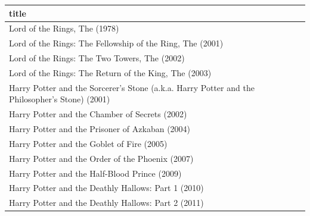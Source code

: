 \documentclass[]{article}
\begin{document}
\begin{longtable}[]{@{}l@{}}
\toprule
\begin{minipage}[b]{0.97\columnwidth}\raggedright\strut
title\strut
\end{minipage}\tabularnewline
\midrule
\endhead
\begin{minipage}[t]{0.97\columnwidth}\raggedright\strut
Lord of the Rings, The (1978)\strut
\end{minipage}\tabularnewline
\begin{minipage}[t]{0.97\columnwidth}\raggedright\strut
Lord of the Rings: The Fellowship of the Ring, The (2001)\strut
\end{minipage}\tabularnewline
\begin{minipage}[t]{0.97\columnwidth}\raggedright\strut
Lord of the Rings: The Two Towers, The (2002)\strut
\end{minipage}\tabularnewline
\begin{minipage}[t]{0.97\columnwidth}\raggedright\strut
Lord of the Rings: The Return of the King, The (2003)\strut
\end{minipage}\tabularnewline
\begin{minipage}[t]{0.97\columnwidth}\raggedright\strut
Harry Potter and the Sorcerer's Stone (a.k.a. Harry Potter and the
Philosopher's Stone) (2001)\strut
\end{minipage}\tabularnewline
\begin{minipage}[t]{0.97\columnwidth}\raggedright\strut
Harry Potter and the Chamber of Secrets (2002)\strut
\end{minipage}\tabularnewline
\begin{minipage}[t]{0.97\columnwidth}\raggedright\strut
Harry Potter and the Prisoner of Azkaban (2004)\strut
\end{minipage}\tabularnewline
\begin{minipage}[t]{0.97\columnwidth}\raggedright\strut
Harry Potter and the Goblet of Fire (2005)\strut
\end{minipage}\tabularnewline
\begin{minipage}[t]{0.97\columnwidth}\raggedright\strut
Harry Potter and the Order of the Phoenix (2007)\strut
\end{minipage}\tabularnewline
\begin{minipage}[t]{0.97\columnwidth}\raggedright\strut
Harry Potter and the Half-Blood Prince (2009)\strut
\end{minipage}\tabularnewline
\begin{minipage}[t]{0.97\columnwidth}\raggedright\strut
Harry Potter and the Deathly Hallows: Part 1 (2010)\strut
\end{minipage}\tabularnewline
\begin{minipage}[t]{0.97\columnwidth}\raggedright\strut
Harry Potter and the Deathly Hallows: Part 2 (2011)\strut
\end{minipage}\tabularnewline
\bottomrule
\end{longtable}
\end{document}
